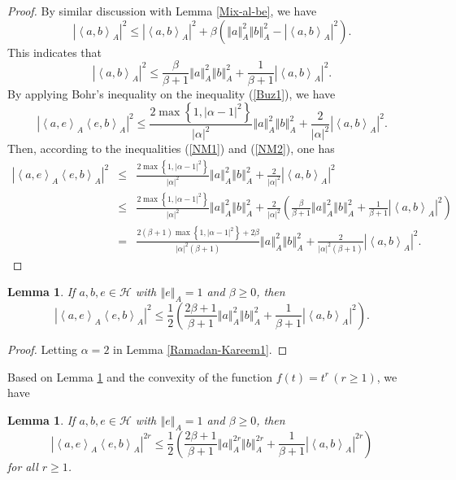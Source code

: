 \documentclass{article}
\newcommand{\bra}[1]{\left(#1\right)}
\newcommand{\seqA}[1]{{\left<#1\right>}_{A}}
\newcommand{\normA}[1]{{\left\Vert#1\right\Vert}_{A}}
\newcommand{\abs}[1]{\left\vert#1\right\vert}
\newcommand{\set}[1]{\left\{#1\right\}}
\newcommand {\h}{\mathcal{H}}
\newtheorem{lemma}[theorem]{Lemma}
\begin{document}
\begin{proof} By similar discussion with Lemma \ref{Mix-al-be}, we have
$$\abs{\seqA{a,b}}^2\leq \abs{\seqA{a,b}}^2+\beta\bra{\normA{a}^2\normA{b}^2-\abs{\seqA{a,b}}^2}.$$
This indicates that
\begin{equation}\label{NM1}
  \abs{\seqA{a,b}}^2\leq \frac{\beta}{\beta+1}\normA{a}^2\normA{b}^2+\frac{1}{\beta+1}\abs{\seqA{a,b}}^2.
\end{equation}
By applying Bohr's inequality on the inequality (\ref{Buz1}), we have
\begin{equation}\label{NM2}
 \abs{\seqA{a,e}\seqA{e,b}}^2\leq \frac{2\max\set{1,\abs{\alpha-1}^2}}{\abs{\alpha}^2}\normA{a}^2\normA{b}^2+\frac{2}{\abs{\alpha}^2}\abs{\seqA{a,b}}^2.
\end{equation}
Then, according to the inequalities (\ref{NM1}) and (\ref{NM2}), one has
\begin{eqnarray*}
  \abs{\seqA{a,e}\seqA{e,b}}^2 &\leq& \frac{2\max\set{1,\abs{\alpha-1}^2}}{\abs{\alpha}^2}\normA{a}^2\normA{b}^2+\frac{2}{\abs{\alpha}^2}\abs{\seqA{a,b}}^2\\
   &\leq&\frac{2\max\set{1,\abs{\alpha-1}^2}}{\abs{\alpha}^2}\normA{a}^2\normA{b}^2
   +\frac{2}{\abs{\alpha}^2}\bra{\frac{\beta}{\beta+1}\normA{a}^2\normA{b}^2+\frac{1}{\beta+1}\abs{\seqA{a,b}}^2}\\
   &=& \frac{2(\beta+1)\max\set{1,\abs{\alpha-1}^2}+2\beta}{\abs{\alpha}^2(\beta+1)}\normA{a}^2\normA{b}^2+\frac{2}{\abs{\alpha}^2(\beta+1)}\abs{\seqA{a,b}}^2.
\end{eqnarray*}
\end{proof}
\begin{lemma}\label{Lem:Buz-beta} If $a,b,e\in\h$ with $\normA{e}=1$ and $\beta\geq 0$, then
  \begin{equation}\label{Ramad13}
    \abs{\seqA{a,e}\seqA{e,b}}^2\leq\frac{1}{2}\bra{\frac{2\beta+1}{\beta+1}\normA{a}^2\normA{b}^2
    +\frac{1}{\beta+1}\abs{\seqA{a,b}}^2}.
  \end{equation}
\end{lemma}
\begin{proof} Letting $\alpha=2$ in Lemma \ref{Ramadan-Kareem1}.
\end{proof}
Based on Lemma \ref{Lem:Buz-beta} and the convexity of the function $f(t)=t^r\,(r\geq 1)$, we have
\begin{lemma}\label{Lem:Buz-bet-Pow-r} If $a,b,e\in\h$ with $\normA{e}=1$ and $\beta\geq 0$, then
  \begin{equation}\label{Ramad13}
    \abs{\seqA{a,e}\seqA{e,b}}^{2r}\leq\frac{1}{2}\bra{\frac{2\beta+1}{\beta+1}\normA{a}^{2r}\normA{b}^{2r}
    +\frac{1}{\beta+1}\abs{\seqA{a,b}}^{2r}}
  \end{equation}
  for all $r\geq 1$.
\end{lemma}
\end{document}
